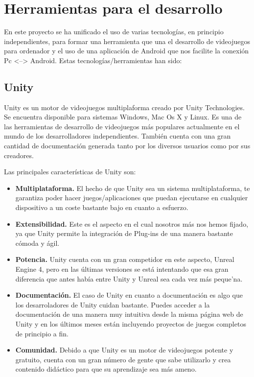 \section{Herramientas para el desarrollo}
\label{cap2:sec:herramientas}

En este proyecto se ha unificado el uso de varias tecnolog\'ias, en principio independientes, para formar una herramienta que una el desarrollo de videojuegos para ordenador y el uso de una aplicaci\'on de Android que nos facilite la conexi\'on Pc <--> Android. Estas tecnolog\'ias/herramientas han sido:
\subsection{Unity}
\label{cap2:subsec:unity}

Unity es un motor de videojuegos multiplaforma creado por Unity Technologies. Se encuentra disponible para sistemas Windows, Mac Os X y Linux. Es una de las herramientas de desarrollo de videojuegos m\'as populares actualmente en el mundo de los desarrolladores independientes. Tambi\'en cuenta con una gran cantidad de documentaci\'on generada tanto por los diversos usuarios como por sus creadores.

Las principales caracter\'isticas de Unity son:

\begin{itemize}
\item \textbf{Multiplataforma.} El hecho de que Unity sea un sistema multiplataforma, te garantiza poder hacer juegos/aplicaciones que puedan ejecutarse en cualquier dispositivo a un coste bastante bajo en cuanto a esfuerzo. 

\item  \textbf{Extensibilidad.} Este es el aspecto en el cual nosotros m\'as nos hemos fijado, ya que Unity permite la integraci\'on de Plug-ins de una manera bastante c\'omoda y \'agil.

\item  \textbf{Potencia.} Unity cuenta con un gran competidor en este aspecto, Unreal Engine 4, pero en las \'ultimas versiones se est\'a intentando que esa gran diferencia que antes hab\'ia entre Unity y Unreal sea cada vez m\'as peque'na.

\item  \textbf{Documentaci\'on.} El caso de Unity en cuanto a documentaci\'on es algo que los desarroladores de Unity cuidan bastante. Puedes acceder a la documentaci\'on de una manera muy intuitiva desde la misma p\'agina web de Unity y en los \'ultimos meses est\'an incluyendo proyectos de juegos completos de principio a fin.

\item  \textbf{Comunidad.} Debido a que Unity es un motor de videojuegos potente y gratuito, cuenta con un gran n\'umero de gente que sabe utilizarlo y crea contenido did\'actico para que su aprendizaje sea m\'as ameno.
\end{itemize}

